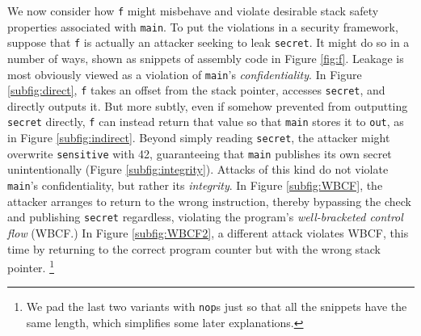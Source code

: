 \documentclass[10pt,conference]{ieeetran}%
\theoremstyle{definition}
\begin{document}
We now consider how {\tt f} might misbehave and violate desirable
stack safety properties associated with {\tt main}. To put the violations in a
security framework, suppose that {\tt f} is actually an attacker seeking
to leak {\tt secret}. It might do so in a number of ways, shown as snippets of
assembly code in Figure \ref{fig:f}.
%
Leakage is most obviously viewed as a violation of {\tt main}'s {\it confidentiality}.
In Figure \ref{subfig:direct}, {\tt f} takes an offset from the stack
pointer, accesses {\tt secret}, and directly outputs it. But more
subtly, even if somehow prevented from outputting {\tt secret} directly, {\tt f}
can instead return that value so that {\tt main} stores it to {\tt out},
as in Figure \ref{subfig:indirect}.
%
Beyond simply reading {\tt secret}, the attacker might overwrite {\tt sensitive}
with 42, guaranteeing that {\tt main} publishes its own secret unintentionally
(Figure \ref{subfig:integrity}).
Attacks of this kind do not violate {\tt main}'s confidentiality, but
rather its {\it integrity}.
In Figure \ref{subfig:WBCF}, the attacker arranges to return to the
wrong instruction, thereby bypassing the check and publishing {\tt secret} regardless,
violating the program's {\it well-bracketed control flow} (WBCF.)
%
In Figure \ref{subfig:WBCF2}, a different attack violates WBCF, this time
by returning to the correct program counter but with the wrong stack pointer.
\footnote{We pad the last two variants with {\tt nop}s just so that all the
snippets have the same length, which simplifies some later explanations.}
\end{document}
